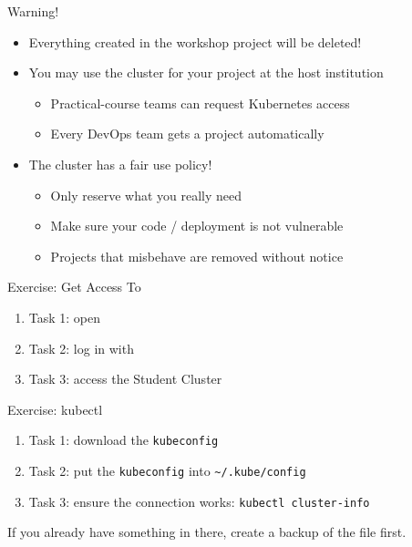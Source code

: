 \begin{frame}{Warning!}
  \begin{itemize}
    \item Everything created in the workshop \wsClusterPlatform{} project will be deleted!
    \item You may use the cluster for your project at the host institution
      \begin{itemize}
        \item Practical-course teams can request Kubernetes access
        \item Every DevOps team gets a \wsClusterPlatform{} project automatically
      \end{itemize}
    \item The cluster has a fair use policy!
      \begin{itemize}
        \item Only reserve what you really need
        \item Make sure your code / deployment is not vulnerable
        \item Projects that misbehave are removed without notice
      \end{itemize}
  \end{itemize}
\end{frame}

\begin{frame}{\exicon Exercise: Get Access To \wsClusterPlatform}
  \vspace{1cm}
  \begin{enumerate}
    \item Task 1: open \underline{\wsClusterURL}
    \item Task 2: log in with \wsAccountWording
    \item Task 3: access the Student Cluster
  \end{enumerate}
\end{frame}

\begin{frame}{\exicon Exercise: kubectl}
  \begin{enumerate}
    \item Task 1: download the \texttt{kubeconfig}
    \item Task 2: put the \texttt{kubeconfig} into \texttt{\textasciitilde/.kube/config}
    \item Task 3: ensure the connection works: \texttt{kubectl cluster-info}
  \end{enumerate}
  \bigskip
  If you already have something in there, create a backup of the file first.
\end{frame}

